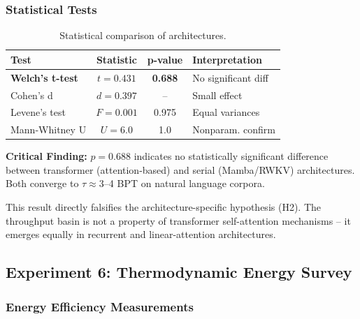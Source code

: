 \documentclass[11pt,a4paper]{article}
\begin{document}
\subsubsection{Statistical Tests}

\begin{table}[h]
\centering
\begin{tabular}{lccl}
\toprule
Test & Statistic & p-value & Interpretation \\
\midrule
\textbf{Welch's t-test} & $t = 0.431$ & \textbf{0.688} & No significant diff \\
Cohen's d & $d = 0.397$ & -- & Small effect \\
Levene's test & $F = 0.001$ & 0.975 & Equal variances \\
Mann-Whitney U & $U = 6.0$ & 1.0 & Nonparam. confirm \\
\bottomrule
\end{tabular}
\caption{Statistical comparison of architectures.}
\label{tab:arch-stats}
\end{table}

\textbf{Critical Finding:} $p = 0.688$ indicates no statistically significant difference between transformer (attention-based) and serial (Mamba/RWKV) architectures. Both converge to $\tau \approx 3$--4 BPT on natural language corpora.

This result directly falsifies the architecture-specific hypothesis (H2). The throughput basin is not a property of transformer self-attention mechanisms -- it emerges equally in recurrent and linear-attention architectures.

\subsection{Experiment 6: Thermodynamic Energy Survey}

\subsubsection{Energy Efficiency Measurements}
\end{document}
